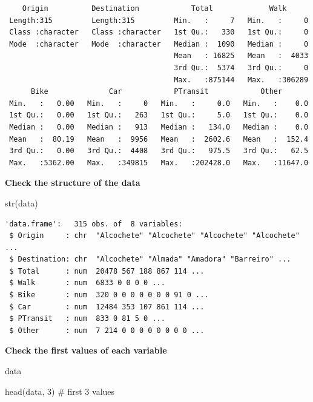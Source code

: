 \documentclass[
  letterpaper,
  DIV=11,
  numbers=noendperiod]{scrreprt}
\newenvironment{Shaded}{\begin{snugshade}}{\end{snugshade}}
\newcommand{\CommentTok}[1]{\textcolor[rgb]{0.37,0.37,0.37}{#1}}
\newcommand{\DecValTok}[1]{\textcolor[rgb]{0.68,0.00,0.00}{#1}}
\newcommand{\FunctionTok}[1]{\textcolor[rgb]{0.28,0.35,0.67}{#1}}
\newcommand{\NormalTok}[1]{\textcolor[rgb]{0.00,0.23,0.31}{#1}}
\begin{document}
\begin{verbatim}
    Origin          Destination            Total             Walk       
 Length:315         Length:315         Min.   :     7   Min.   :     0  
 Class :character   Class :character   1st Qu.:   330   1st Qu.:     0  
 Mode  :character   Mode  :character   Median :  1090   Median :     0  
                                       Mean   : 16825   Mean   :  4033  
                                       3rd Qu.:  5374   3rd Qu.:     0  
                                       Max.   :875144   Max.   :306289  
      Bike              Car            PTransit            Other        
 Min.   :   0.00   Min.   :     0   Min.   :     0.0   Min.   :    0.0  
 1st Qu.:   0.00   1st Qu.:   263   1st Qu.:     5.0   1st Qu.:    0.0  
 Median :   0.00   Median :   913   Median :   134.0   Median :    0.0  
 Mean   :  80.19   Mean   :  9956   Mean   :  2602.6   Mean   :  152.4  
 3rd Qu.:   0.00   3rd Qu.:  4408   3rd Qu.:   975.5   3rd Qu.:   62.5  
 Max.   :5362.00   Max.   :349815   Max.   :202428.0   Max.   :11647.0  
\end{verbatim}

\textbf{Check the structure of the data}

\begin{Shaded}
\begin{Highlighting}[]
\FunctionTok{str}\NormalTok{(data)}
\end{Highlighting}
\end{Shaded}

\begin{verbatim}
'data.frame':   315 obs. of  8 variables:
 $ Origin     : chr  "Alcochete" "Alcochete" "Alcochete" "Alcochete" ...
 $ Destination: chr  "Alcochete" "Almada" "Amadora" "Barreiro" ...
 $ Total      : num  20478 567 188 867 114 ...
 $ Walk       : num  6833 0 0 0 0 ...
 $ Bike       : num  320 0 0 0 0 0 0 0 91 0 ...
 $ Car        : num  12484 353 107 861 114 ...
 $ PTransit   : num  833 0 81 5 0 ...
 $ Other      : num  7 214 0 0 0 0 0 0 0 0 ...
\end{verbatim}

\textbf{Check the first values of each variable}

\begin{Shaded}
\begin{Highlighting}[]
\NormalTok{data}
\end{Highlighting}
\end{Shaded}

\begin{Shaded}
\begin{Highlighting}[]
\FunctionTok{head}\NormalTok{(data, }\DecValTok{3}\NormalTok{) }\CommentTok{\# first 3 values}
\end{Highlighting}
\end{Shaded}
\end{document}
